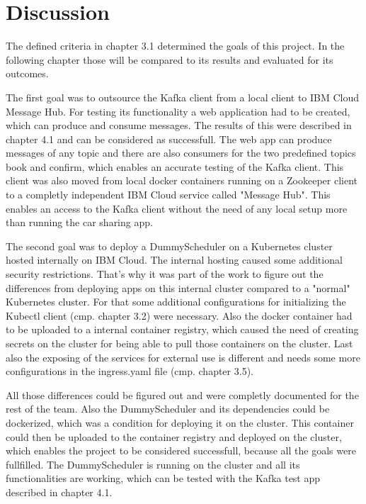 
\chapter{Discussion}

The defined criteria in chapter 3.1 determined the goals of this project. In the following chapter those will be compared to its results and evaluated for its outcomes.

The first goal was to outsource the Kafka client from a local client to IBM Cloud Message Hub. For testing its functionality a web application had to be created, which can produce and consume messages. The results of this were described in chapter 4.1 and can be considered as successfull. The web app can produce messages of any topic and there are also consumers for the two predefined topics book and confirm, which enables an accurate testing of the Kafka client. This client was also moved from local docker containers running on a Zookeeper client to a completly independent IBM Cloud service called "Message Hub". This enables an access to the Kafka client without the need of any local setup more than running the car sharing app.

The second goal was to deploy a DummyScheduler on a Kubernetes cluster hosted internally on IBM Cloud. The internal hosting caused some additional security restrictions. That's why it was part of the work to figure out the differences from deploying apps on this internal cluster compared to a "normal" Kubernetes cluster. For that some additional configurations for initializing the Kubectl client (cmp. chapter 3.2) were necessary. Also the docker container had to be uploaded to a internal container registry, which caused the need of creating secrets on the cluster for being able to pull those containers on the cluster. Last also the exposing of the services for external use is different and needs some more configurations in the ingress.yaml file (cmp. chapter 3.5). 

All those differences could be figured out and were completly documented for the rest of the team. Also the DummyScheduler and its dependencies could be dockerized, which was a condition for deploying it on the cluster. This container could then be uploaded to the container registry and deployed on the cluster, which enables the project to be considered successfull, because all the goals were fullfilled. The DummyScheduler is running on the cluster and all its functionalities are working, which can be tested with the Kafka test app described in chapter 4.1. 


